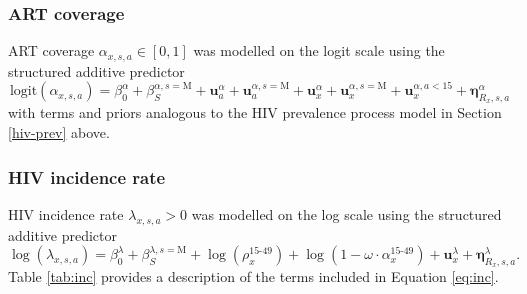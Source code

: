 \documentclass[a4paper, nobind]{templates/ociamthesis}
\begin{document}
\hypertarget{art-cov}{%
\subsubsection{ART coverage}\label{art-cov}}

ART coverage \(\alpha_{x, s, a} \in [0, 1]\) was modelled on the logit scale using the structured additive predictor
\begin{equation}
\text{logit}(\alpha_{x, s, a}) = \beta^\alpha_0 + \beta_{S}^{\alpha, s = \text{M}} + \mathbf{u}^\alpha_a + \mathbf{u}_a^{\alpha, s = \text{M}} + \mathbf{u}^\alpha_x + \mathbf{u}_x^{\alpha, s = \text{M}} + \mathbf{u}_x^{\alpha, a < 15} + \boldsymbol{\mathbf{\eta}}^\alpha_{R_x, s, a} 
\end{equation}
with terms and priors analogous to the HIV prevalence process model in Section \ref{hiv-prev} above.

\hypertarget{hiv-inc}{%
\subsubsection{HIV incidence rate}\label{hiv-inc}}

HIV incidence rate \(\lambda_{x, s, a} > 0\) was modelled on the log scale using the structured additive predictor
\begin{equation}
\log(\lambda_{x, s, a}) = \beta_0^\lambda + \beta_S^{\lambda, s = \text{M}} + \log(\rho_{x}^{\text{15-49}}) + \log(1 - \omega \cdot \alpha_{x}^{\text{15-49}}) + \mathbf{u}_x^\lambda + \boldsymbol{\mathbf{\eta}}_{R_x, s, a}^\lambda. \label{eq:inc}
\end{equation}
Table \ref{tab:inc} provides a description of the terms included in Equation \eqref{eq:inc}.
\end{document}
